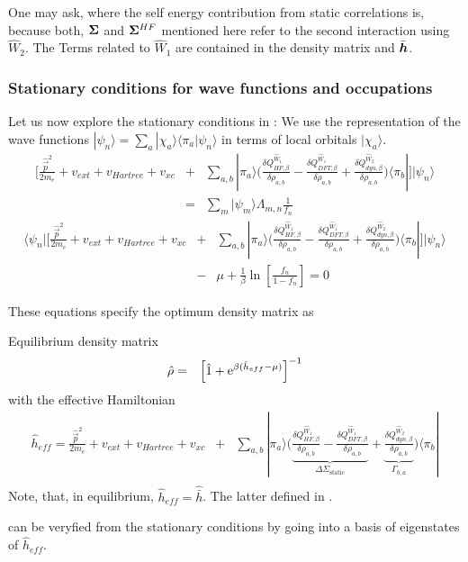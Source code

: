 \documentclass[11pt,a4paper]{report}
\begin{document}
One may ask, where the self energy contribution from static
correlations is, because both, $\bm{\Sigma}$ and $\bm{\Sigma}^{HF}$
mentioned here refer to the second interaction using $\hat{W}_2$. The
Terms related to $\hat{W}_1$ are contained in the density matrix and
$\bar{\bm{h}}$.
\subsubsection{Stationary conditions for wave functions and occupations}
Let us now explore the stationary conditions in : We use the
representation of the wave functions $|\psi_n\rangle=\sum_a
|\chi_a\rangle\langle\pi_a|\psi_n\rangle$ in terms of local orbitals
$|\chi_a\rangle$.
\begin{eqnarray}
\biggl[\frac{\hat{\vec{p}}^2}{2m_e}+v_{ext}+v_{Hartree}+v_{xc}
&
+&\sum_{a,b}|\pi_a\rangle\biggl(
\frac{\delta Q^{\hat{W}_1}_{HF,\beta}}{\delta\rho_{a,b}}
-\frac{\delta Q^{\hat{W}_1}_{DFT,\beta}}{\delta\rho_{a,b}}
+\frac{\delta Q^{\hat{W}_2}_{dyn,\beta}}{\delta\rho_{a,b}}
\biggr)\langle\pi_b|
\biggr]|\psi_n\rangle
\nonumber\\
&=&\sum_{m}|\psi_m\rangle\Lambda_{m,n}\frac{1}{f_n}
\end{eqnarray}
\begin{eqnarray}
\langle\psi_n|
\biggl[
\frac{\hat{\vec{p}}^2}{2m_e}+v_{ext}+v_{Hartree}+v_{xc}
&+&\sum_{a,b}|\pi_a\rangle\biggl(
\frac{\delta Q^{\hat{W}_1}_{HF,\beta}}{\delta\rho_{a,b}}
-\frac{\delta Q^{\hat{W}_1}_{DFT,\beta}}{\delta\rho_{a,b}}
+\frac{\delta Q^{\hat{W}_2}_{dyn,\beta}}{\delta\rho_{a,b}}
\biggr)\langle\pi_b|
\biggr]|\psi_n\rangle
\nonumber\\
&-&\mu+\frac{1}{\beta}\ln\left[\frac{f_n}{1-f_n}\right]=0
\end{eqnarray}

These equations specify the optimum density matrix as
\begin{myshadowminipage}{Equilibrium density matrix}
\begin{eqnarray}
\hat{\rho}&=&\left[\hat{1}+\mathrm{e}^{\beta(\hat{h}_{eff}-\mu)}\right]^{-1}
\label{eq:rhoopt}
\end{eqnarray}
with the effective Hamiltonian
\begin{eqnarray}
\hat{h}_{eff}=\frac{\hat{\vec{p}}^2}{2m_e}+v_{ext}+v_{Hartree}+v_{xc}
&+&\sum_{a,b}|\pi_a\rangle\biggl(
\underbrace{\frac{\delta Q^{\hat{W}_1}_{HF,\beta}}{\delta\rho_{a,b}}
-\frac{\delta Q^{\hat{W}_1}_{DFT,\beta}}{\delta\rho_{a,b}}
}_{\Delta\Sigma_{\text{static}}}
+\underbrace{\frac{\delta Q^{\hat{W}_2}_{dyn,\beta}}{\delta\rho_{a,b}}
}_{\Gamma_{b,a}}
\biggr)\langle\pi_b|
\nonumber\\
\label{eq:heffeq}
\end{eqnarray}
Note, that, in equilibrium, $\hat{h}_{eff}=\hat{\bar{h}}$. The latter
defined in .
\end{myshadowminipage}
 can be veryfied from the stationary conditions by going
into a basis of eigenstates of $\hat{h}_{eff}$.
\end{document}
